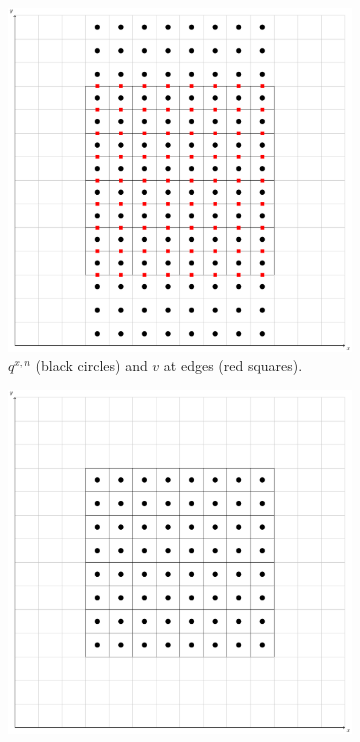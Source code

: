 \documentclass[preprint,12pt]{elsarticle}
\begin{document}
\begin{linenumbers}
\begin{figure}[!htb]
\begin{subfigure}{0.3\textwidth}
		\includegraphics[width=0.95\linewidth]{2d_grid_FQ}
		\caption{$q^{x,n}$ (black circles) and $v$ at edges (red squares).\label{lt-FQx} }
	\end{subfigure}
	\begin{subfigure}{0.3\textwidth}
		\centering
		\includegraphics[width=0.95\linewidth]{2d_grid_GFQ}

\end{subfigure}
\end{figure}
\end{linenumbers}
\end{document}
